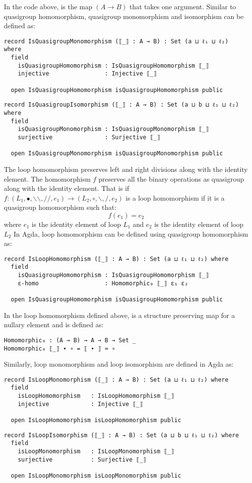 In the code above,  is the map $(A \rightarrow B)$ that takes one
argument. Similar to quasigroup homomorphism, quasigroup monomorphism and
isomorphism can be defined as: 

\begin{verbatim}
record IsQuasigroupMonomorphism (⟦_⟧ : A → B) : Set (a ⊔ ℓ₁ ⊔ ℓ₂) where
  field
    isQuasigroupHomomorphism : IsQuasigroupHomomorphism ⟦_⟧
    injective                : Injective ⟦_⟧

  open IsQuasigroupHomomorphism isQuasigroupHomomorphism public
\end{verbatim}
\begin{verbatim}
record IsQuasigroupIsomorphism (⟦_⟧ : A → B) : Set (a ⊔ b ⊔ ℓ₁ ⊔ ℓ₂) where
  field
    isQuasigroupMonomorphism : IsQuasigroupMonomorphism ⟦_⟧
    surjective               : Surjective ⟦_⟧

  open IsQuasigroupMonomorphism isQuasigroupMonomorphism public
\end{verbatim}

The loop homomorphism preserves left and right divisions along with the identity
element. The homomorphism $f$ preserves all the binary operations as quasigroup
along with the identity element. That is if \( f:(L_1,∙,\backslash
\backslash,//,e_1) \rightarrow (L_2,\circ,\backslash,/,e_2) \) is a loop homomorphism if
it is a quasigroup homomorphism such that: 
\[f(e_1) = e_2\] where $e_1$ is the identity element of loop $L_1$ and $e_2$ is
the identity element of loop $L_2$
In Agda, loop homomorphism can be defined using quasigroup homomorphism as:
\begin{verbatim}
record IsLoopHomomorphism (⟦_⟧ : A → B) : Set (a ⊔ ℓ₁ ⊔ ℓ₂) where
  field
    isQuasigroupHomomorphism : IsQuasigroupHomomorphism ⟦_⟧
    ε-homo                   : Homomorphic₀ ⟦_⟧ ε₁ ε₂

  open IsQuasigroupHomomorphism isQuasigroupHomomorphism public
\end{verbatim}
In the loop homomorphism defined above,  is a structure
preserving map for a nullary element and is defined as:
\begin{verbatim}
Homomorphic₀ : (A → B) → A → B → Set _
Homomorphic₀ ⟦_⟧ ∙ ∘ = ⟦ ∙ ⟧ ≈ ∘
\end{verbatim}
Similarly, loop monomorphism and loop isomorphism are defined in Agda as:
\begin{verbatim}
record IsLoopMonomorphism (⟦_⟧ : A → B) : Set (a ⊔ ℓ₁ ⊔ ℓ₂) where
  field
    isLoopHomomorphism   : IsLoopHomomorphism ⟦_⟧
    injective            : Injective ⟦_⟧

  open IsLoopHomomorphism isLoopHomomorphism public
\end{verbatim}
\begin{verbatim}  
record IsLoopIsomorphism (⟦_⟧ : A → B) : Set (a ⊔ b ⊔ ℓ₁ ⊔ ℓ₂) where
  field
    isLoopMonomorphism   : IsLoopMonomorphism ⟦_⟧
    surjective           : Surjective ⟦_⟧

  open IsLoopMonomorphism isLoopMonomorphism public
\end{verbatim}

